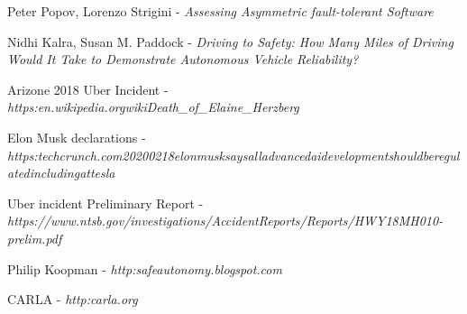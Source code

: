 \begin{thebibliography}{9}

Peter Popov, Lorenzo Strigini - \textit{Assessing Asymmetric fault-tolerant Software}

Nidhi Kalra, Susan M. Paddock - \textit{Driving to Safety: How Many Miles of Driving Would It Take to Demonstrate Autonomous Vehicle Reliability?}

Arizone 2018 Uber Incident - 
\textit{https:\/\/en.wikipedia.org\/wiki\/Death\_of\_Elaine\_Herzberg}

Elon Musk declarations - \textit{https:\/\/techcrunch.com\/2020\/02\/18\/elon\-musk\-says\-all\-advanced\-ai\-development\-should\-be\-regulated\-including\-at\-tesla}

Uber incident Preliminary Report - \textit{https://www.ntsb.gov/investigations/AccidentReports/Reports/HWY18MH010-prelim.pdf}

Philip Koopman - \textit{http:\/\/safeautonomy.blogspot.com\/}

CARLA - \textit{http:\/\/carla.org\/}

\end{thebibliography}